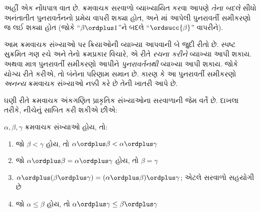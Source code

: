 અહીં એક નોંધપાત્ર વાત છે. ક્રમવાચક સરવાળો
વ્યાખ્યાયિત કરવા આપણે \emph{તેના બદલે} સીધો
અનંતાતીત પુનરાવર્તનનો પ્રમેય વાપરી શક્યા હોત,
અને માં આપેલી પુનરાવર્તી
સમીકરણો જ લઈ શક્યા હોત (જોકે
``$\beta \ordplus 1$''ને બદલે
``$\ordsucc{\beta}$'' વાપરીને).

આમ ક્રમવાચક સંખ્યાઓ પર ક્રિયાઓની વ્યાખ્યા આપવાની
બે જુદી રીતો છે. સ્પષ્ટ સુક્રમિત ગણ રચે અને તેનો
ક્રમપ્રકાર વિચારે, એ રીતે \emph{રચના કરીને} વ્યાખ્યા
આપી શકાય. અથવા માત્ર પુનરાવર્તી સમીકરણો આપીને
\emph{પુનરાવર્તનથી} વ્યાખ્યા આપી શકાય. જોકે યોગ્ય
રીતે કરીએ, તો બંનેના પરિણામ સમાન છે. કારણ કે
આ પુનરાવર્તી સમીકરણો \emph{અનન્ય} ક્રમવાચક સંખ્યાઓ
નક્કી કરે છે તેની ખાતરી આપે છે.

ઘણી રીતે ક્રમવાચક અંકગણિત પ્રાકૃતિક સંખ્યાઓના
સરવાળાની જેમ વર્તે છે. દાખલા તરીકે, નીચેનું સાબિત
કરી શકીએ છીએ:

\begin{lem}
$\alpha, \beta, \gamma$ ક્રમવાચક સંખ્યાઓ હોય, તો:
\begin{enumerate}
	\item{} જો $\beta < \gamma$ હોય, તો $\alpha
	\ordplus  \beta < \alpha \ordplus  \gamma$
	\item{} જો $\alpha \ordplus  \beta =
	\alpha\ordplus \gamma$ હોય, તો $\beta = \gamma$
	\item{} $\alpha \ordplus  (\beta \ordplus
	\gamma) = (\alpha \ordplus  \beta) \ordplus  \gamma$;
	એટલે સરવાળો સહયોગી છે
	\item{} જો $\alpha \leq \beta$ હોય, તો $\alpha
	\ordplus  \gamma \leq \beta \ordplus \gamma$
\end{enumerate}
\end{lem}

